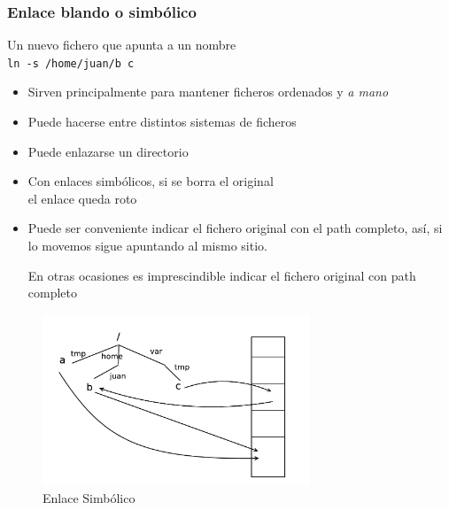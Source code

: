 \documentclass[ucs]{beamer}
\begin{document}
\begin{frame}[fragile]
\frametitle{Enlace blando o simbólico}

Un nuevo fichero que apunta a un nombre\\
 \verb|ln -s /home/juan/b c|   
\begin{itemize}	
\item
Sirven principalmente para mantener ficheros ordenados y \emph{a mano}

\item 
Puede hacerse entre distintos sistemas de ficheros
\item
Puede enlazarse un directorio
\item 
Con enlaces simbólicos, si se borra el original\\
el enlace queda roto
\item 
Puede ser conveniente indicar el fichero original con
el path completo, así, si lo movemos sigue apuntando al mismo sitio.

En otras ocasiones es imprescindible indicar el
fichero original con path completo
\end{itemize}


\end{frame}




\begin{frame}[fragile]
\begin{figure}
\centerline{\includegraphics[width=8cm]{figs/enlace_blando}}
\caption{Enlace Simbólico}
\end{figure}
\end{frame}
\end{document}
